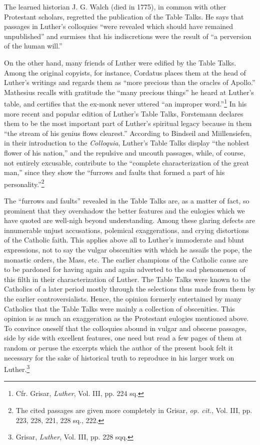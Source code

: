 The learned historian J. G. Walch (died in 1775), in common with
other Protestant scholars, regretted the publication of the Table Talks.
He says that passages in Luther’s colloquies “were revealed which
should have remained unpublished” and surmises that his indiscretions
were the result of “a perversion of the human will.”

On the other hand, many friends of Luther were edified by the
Table Talks. Among the original copyists, for instance, Cordatus
places them at the head of Luther’s writings and regards them as
“more precious than the oracles of Apollo.” Mathesius recalls with
gratitude the “many precious things” he heard at Luther’s table, and
certifies that the ex-monk never uttered “an improper word.”\footnote{Cfr. Grisar, \textit{Luther}, Vol. III, pp. 224 sq.}
In his more recent and popular edition of Luther’s Table Talks, Forstemann
declares them to be the most important part of Luther’s spiritual legacy
because in them “the stream of his genius flows clearest.”
According to Bindseil and Miillensiefen, in their introduction to the
\textit{Colloquia}, Luther’s Table Talks display “the noblest flower of his
nation,” and the repulsive and uncouth passages, while, of course,
not entirely excusable, contribute to the “complete characterization
of the great man,” since they show the “furrows and faults that
formed a part of his personality.”\footnote
{The cited passages are given more completely in Grisar, \textit{op. cit.}, Vol. III, pp. 223, 228,
221, 228 sq., 222.}

The “furrows and faults” revealed in the Table Talks are, as a matter
of fact, so prominent that they overshadow the better features and
the eulogies which we have quoted are well-nigh beyond understanding.
Among these glaring defects are innumerable unjust accusations,
polemical exaggerations, and crying distortions of the Catholic
faith. This applies above all to Luther’s immoderate and blunt
expressions, not to say the vulgar obscenities with which he assails
the pope, the monastic orders, the Mass, etc. The earlier champions
of the Catholic cause are to be pardoned for having again and
again adverted to the sad phenomenon of this filth in their characterization
of Luther. The Table Talks were known to the Catholics
of a later period mostly through the selections thus made from them
by the earlier controversialists. Hence, the opinion formerly entertained
by many Catholics that the Table Talks were mainly a collection
of obscenities. This opinion is as much an exaggeration as
the Protestant eulogies mentioned above. To convince oneself that
the colloquies abound in vulgar and obscene passages, side by side
with excellent features, one need but read a few pages of them at random
or peruse the excerpts which the author of the present book
felt it necessary for the sake of historical truth to reproduce in his
larger work on Luther.\footnote{Grisar, \textit{Luther}, Vol. III, pp. 228 sqq.}

